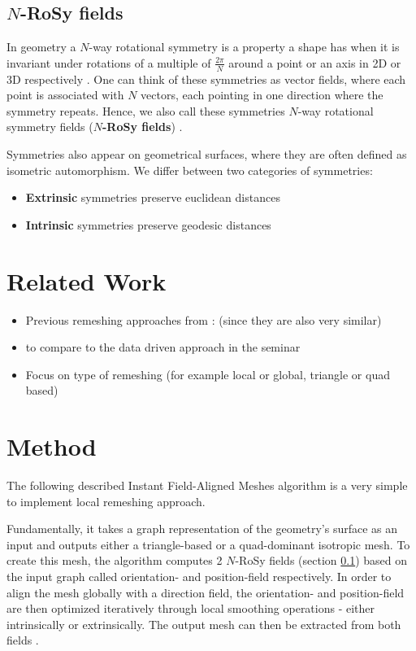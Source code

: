 \documentclass{ACGSeminar}
\begin{document}
\subsection{$N$-RoSy fields}\label{rosy}
In geometry a $N$-way rotational symmetry is a property a shape has when it is invariant under rotations of a multiple of $\frac{2\pi}{N}$ around a point or an axis in 2D or 3D respectively \cite{palacios2007rotational}. One can think of these symmetries as vector fields, where each point is associated with $N$ vectors, each pointing in one direction where the symmetry repeats. Hence, we also call these symmetries $N$-way rotational symmetry fields (\textbf{$N$-RoSy fields}) \cite{panozzo2012fields}.

Symmetries also appear on geometrical surfaces, where they are often defined as isometric automorphism. We differ between two categories of symmetries:
\begin{itemize}
	\item	\textbf{Extrinsic} symmetries preserve euclidean distances
	\item	\textbf{Intrinsic} symmetries preserve geodesic distances
\end{itemize}


\section{Related Work}\label{related_work}
\begin{itemize}
	\item	Previous remeshing approaches from \cite{jakob2015instant}: \cite{ray2006periodic,bommes2009mixed} (since they are also very similar)
	\item	\cite{marcias2015data} to compare to the data driven approach in the seminar
	\item	Focus on type of remeshing (for example local or global, triangle or quad based)
\end{itemize}

\section{Method}\label{algorithm}
The following described Instant Field-Aligned Meshes algorithm is a very simple to implement local remeshing approach.

Fundamentally, it takes a graph representation of the geometry's surface as an input and outputs either a triangle-based or a quad-dominant isotropic mesh. To create this mesh, the algorithm computes 2 $N$-RoSy fields (section \ref{rosy}) based on the input graph called orientation- and position-field respectively. In order to align the mesh globally with a direction field, the orientation- and position-field are then optimized iteratively through local smoothing operations - either intrinsically or extrinsically. The output mesh can then be extracted from both fields \cite{jakob2015instant}.
\end{document}
